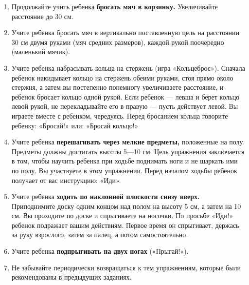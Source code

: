 \documentclass[a5paper]{book}
\begin{document}
\begin{enumerate}
\def\labelenumi{\arabic{enumi}.}
\item
  
  Продолжайте учить ребенка \textbf{бросать мяч в корзинку.}
  Увеличивайте расстояние до 30 см.
  
\item
  
  Учите ребенка бросать мяч в вертикально поставленную цель на
  расстоянии 30 см двумя руками (мяч средних размеров), каждой рукой
  поочередно (маленький мячик).
  
\item
  
  Учите ребенка набрасывать кольца на стержень (игра «Кольцеброс»).
  Сначала ребенок накидывает кольцо на стержень обеими руками, стоя
  прямо около стержня, а затем вы постепенно понемногу увеличиваете
  расстояние, и ребенок бросает кольцо одной рукой. Если ребенок ---
  левша и берет кольцо левой рукой, не перекладывайте его в правую ---
  пусть действует левой. Вы играете вместе с ребенком, чередуясь. Перед
  бросанием кольца говорите ребенку: «Бросай!» или: «Бросай кольцо!»
  
\item
  
  Учите ребенка \textbf{перешагивать через мелкие предметы,} положенные
  на полу. Предметы должны достигать высоты 5---10 см. Цель упражнения
  заключается в том, чтобы научить ребенка при ходьбе поднимать ноги и
  не шаркать ими по полу. Вы участвуете в этом упражнении. Перед началом
  ходьбы ребенок получает от вас инструкцию: «Иди».
  
\item
  
  Учите ребенка \textbf{ходить по наклонной плоскости снизу вверх.}
  Приподнимите доску одним концом над полом на высоту 5 см, а затем на
  10 см. Вы проходите по доске и спрыгиваете на носочки. По просьбе
  «Иди!» ребенок подражает вашим действиям. Первое время он спрыгивает,
  держась за руку взрослого, затем за палец, а потом самостоятельно.
  
\item
  
  Учите ребенка \textbf{подпрыгивать на двух ногах} («Прыгай!»).
  
\item
  
  Не забывайте периодически возвращаться к тем упражнениям, которые были
  рекомендованы в предыдущих заданиях.
  
\end{enumerate}
\end{document}

